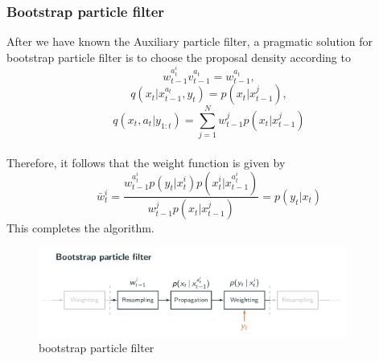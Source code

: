 \documentclass[11pt,oneside,a4paper]{article}
\begin{document}
\subsubsection{Bootstrap particle filter}
After we have known the Auxiliary particle filter, a pragmatic solution for bootstrap particle filter is to choose the proposal density according to
\begin{equation}
w_{t-1}^{a_{t}^{i}} v_{t-1}^{a_{t}} = w_{t-1}^{a_{t}},
\end{equation}
\begin{equation}
q(x_{t}|x_{t-1}^{a_{t}}, y_{t}) = p(x_{t}|x_{t-1}^{j}),
\end{equation}
\begin{equation}
q(x_{t}, a_{t} | y_{1:t}) = \sum_{j=1}^{N}w_{t-1}^{j}p(x_{t}|x_{t-1}^{j})
\end{equation} \\
Therefore, it follows that the weight function is given by
\begin{equation}
\bar{w}_{t}^{i} = \frac{w_{t-1}^{a_{t}^{i}} p(y_{t}|x_{t}^{i}) p(x_{t}^{i}|x_{t-1}^{a_{t}^{i}})}{w_{t-1}^{j}p(x_{t}|x_{t-1}^{j})} = p(y_{t}|x_{t})
\end{equation}
This completes the algorithm.
\begin{figure}[H]
  \begin{center}
  \includegraphics[width=0.9\textwidth]{./source/PF/6.png}
  \caption{bootstrap particle filter}
  \end{center}
  \label{}
\end{figure}
\end{document}

